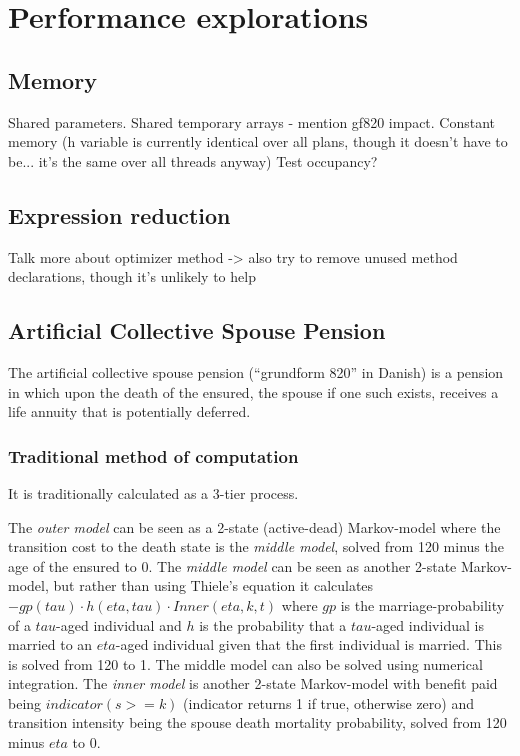 \section{Performance explorations}
\subsection{Memory}
Shared parameters.
Shared temporary arrays - mention gf820 impact.
Constant memory (h variable is currently identical over all plans, though it doesn't have to be... it's the same over all threads anyway)
Test occupancy?

\subsection{Expression reduction}
Talk more about optimizer method -> also try to remove unused method declarations, though it's unlikely to help

\subsection{Artificial Collective Spouse Pension}
The artificial collective spouse pension (``grundform 820'' in Danish) is a pension in which upon the death of the ensured, the spouse if one such exists, receives a life annuity that is potentially deferred.

\subsubsection{Traditional method of computation}
It is traditionally calculated as a 3-tier process.

The \emph{outer model} can be seen as a 2-state (active-dead) Markov-model where the transition cost to the death state is the \emph{middle model}, solved from 120 minus the age of the ensured to 0.
The \emph{middle model} can be seen as another 2-state Markov-model, but rather than using Thiele's equation it calculates $-gp(tau) \cdot h(eta, tau) \cdot Inner(eta, k, t)$ where $gp$ is the marriage-probability of a $tau$-aged individual and $h$ is the probability that a $tau$-aged individual is married to an $eta$-aged individual given that the first individual is married.
This is solved from 120 to 1. The middle model can also be solved using numerical integration.
The \emph{inner model} is another 2-state Markov-model with benefit paid being $indicator(s >= k)$ (indicator returns 1 if true, otherwise zero) and transition intensity being the spouse death mortality probability, solved from 120 minus $eta$ to 0.

